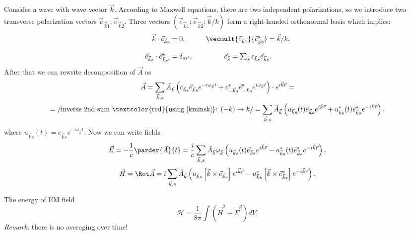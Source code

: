 	Consider a wave with wave vector $\vec{k}$. According to Maxwell equations, there are two independent polarizations, so we introduce two transverse polarization vectors $\vec{e}_{\vec{k}1}; \vec{e}_{\vec{k}2}$. Three vectors $(\vec{e}_{\vec{k}1}; \vec{e}_{\vec{k}2}; \vec{k}/k)$ form a right-handed orthonormal basis which implies:
	\begin{equation}
		\begin{matrix}
			\vec{k} \cdot \vec{e}_{\vec{k}s} = 0, && \vecmult{\vec{e}_{\vec{k}1}}{\vec{e}^*_{\vec{k}2}} = \vec{k}/k, \\ \\
			\vec{e}_{\vec{k}s} \cdot \vec{e}^*_{\vec{k}s'} = \delta_{ss'}, && \vec{c}_{\vec{k}} = \sum_s c_{\vec{k}s} \vec{e}_{\vec{k}s}.
		\end{matrix}
	\end{equation}
	After that we can rewrite decomposition of $\vec{A}$ as
	\begin{multline}
		\vec{A} = \sum_{\vec{k},s} \tilde{A}_{\vec{k}} \left( c_{\vec{k}s} \vec{e}_{\vec{k}s} e^{-i \omega_{\vec{k}} t} + c^*_{-\vec{k}s} \vec{e}^*_{-\vec{k}s}  e^{i \omega_{\vec{k}} t} \right) \cdot e^{i \vec{k} \vec{r}} = \\
		= \left/ \text{inverse 2nd sum \textcolor{red}{using \eqref{kminsk}}: } (-k) \to k \right/ =\sum_{\vec{k},s} \tilde{A}_{\vec{k}} \left( u_{\vec{k}s}(t) \vec{e}_{\vec{k}s} e^{i \vec{k} \vec{r}} + u^*_{\vec{k}s}(t) \vec{e}^*_{\vec{k}s}  e^{-i \vec{k} \vec{r}} \right),
	\end{multline}
	where $u_{\vec{k}s}(t) = c_{\vec{k}s} e^{-i \omega_{\vec{k}} t}$. Now we can write fields
	\begin{equation}
		\vec{E} = -\frac{1}{c} \parder{\vec{A}}{t} = \frac{i}{c} \sum_{\vec{k},s} \tilde{A}_{\vec{k}} \omega_{\vec{k}} \left( u_{\vec{k}s}(t) \vec{e}_{\vec{k}s} e^{i \vec{k} \vec{r}} - u^*_{\vec{k}s}(t) \vec{e}^*_{\vec{k}s}  e^{-i \vec{k} \vec{r}} \right),
	\end{equation}
	\begin{equation}
		\vec{H} = \Rot \vec{A} = i \sum_{\vec{k},s} \tilde{A}_{\vec{k}} \left( u_{\vec{k}s} \left[ \vec{k} \times \vec{e}_{\vec{k}s} \right] e^{i \vec{k} \vec{r}} - u^*_{\vec{k}s} \left[ \vec{k} \times \vec{e}^*_{\vec{k}s} \right] e^{-i \vec{k} \vec{r}} \right).
	\end{equation}
	
	The energy of EM field
	\begin{equation}
		\mathscr{H} = \frac{1}{8 \pi} \int \left(\vec{H}^2 + \vec{E}^2 \right) dV.
	\end{equation} 
	\textit{Remark:} there is no averaging over time!
	
